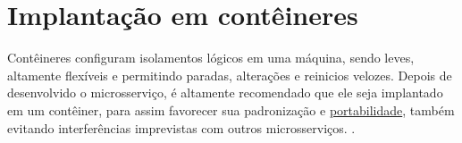 



\section{Implantação em contêineres}\label{secao-conteinerizacao}

Contêineres configuram isolamentos lógicos em uma máquina, sendo leves, altamente flexíveis e permitindo paradas, alterações e reinicios velozes. Depois de desenvolvido o microsserviço, é altamente recomendado que ele seja implantado em um contêiner, para assim favorecer sua padronização e \hyperref[sec:portabilidade]{portabilidade}, também evitando interferências imprevistas com outros microsserviços. \cite{oracle_microservices}.

